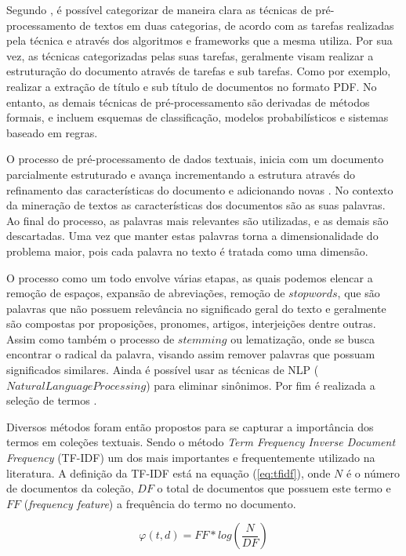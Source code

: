 Segundo \cite{Feldman2007}, é possível categorizar de maneira clara as técnicas de pré-processamento de textos em duas categorias, de acordo com as tarefas realizadas pela técnica e através dos 
algoritmos e frameworks que a mesma utiliza. Por sua vez, as técnicas categorizadas pelas suas 
tarefas, geralmente visam realizar a estruturação do documento através de tarefas e sub tarefas. 
Como por exemplo, realizar a extração de título e sub título de documentos no formato PDF.
No entanto, as demais técnicas de pré-processamento são derivadas de métodos formais, e incluem 
esquemas de classificação, modelos probabilísticos e sistemas baseado em regras.

O processo de pré-processamento de dados textuais, inicia com um documento parcialmente estruturado 
e avança incrementando a estrutura através do refinamento das características do documento e
adicionando novas \cite{Feldman2007}. 
No contexto da mineração de textos as características dos documentos são as 
suas palavras\cite{Haddi2013}. Ao final do processo, as palavras mais relevantes são utilizadas, e as demais
são descartadas. Uma vez que manter estas palavras torna a dimensionalidade do problema maior, pois 
cada palavra no texto é tratada como uma dimensão\cite{Haddi2013}.

O processo como um todo envolve várias etapas, as quais podemos elencar a remoção de espaços, 
expansão de abreviações, remoção de $stopwords$, que são palavras que não possuem relevância no 
significado geral do texto e geralmente são compostas por proposições, pronomes, artigos,
interjeições dentre outras\cite{Nogueira2013}. Assim como também o processo de $stemming$ ou 
lematização, onde se busca encontrar o radical da palavra, visando assim remover palavras que 
possuam significados similares. Ainda é possível usar as técnicas de NLP 
($Natural Language Processing$) para eliminar sinônimos. Por fim é realizada a seleção de 
termos \cite{Haddi2013}. 

Diversos métodos foram então propostos para se capturar a importância dos termos em coleções 
textuais. Sendo o método { \it Term Frequency Inverse 
Document Frequency\/ }(TF-IDF) um dos mais importantes\cite{Haddi2013} e frequentemente utilizado na literatura. A definição da TF-IDF está na equação (\ref{eq:tfidf}), onde $N$ é o número de 
documentos da coleção, $DF$ o total de documentos que possuem este termo e $FF$ ({\it frequency feature}) a frequência do termo no documento.

\begin{equation}
  \varphi(t,d) = FF * log(\frac{N}{DF}) 
 \label{eq:tfidf}
\end{equation}

